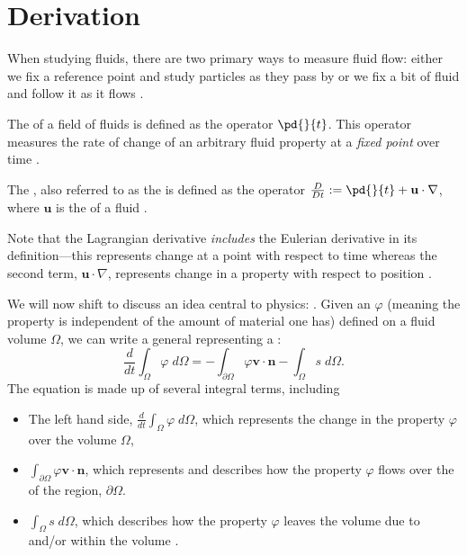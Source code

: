 \documentclass[12pt]{article}
\renewcommand{\vec}[1]{\mathbf{#1}}
\begin{document}
    \section{Derivation}
    When studying fluids, there are two primary ways to measure fluid flow: either we fix a reference point and study particles as they pass by or we fix a bit of fluid and follow it as it flows \cite{wikiderivation}.
    \begin{definition}
        The  of a field of fluids is defined as the operator $\pd{}{t}$. This operator measures the rate of change of an arbitrary fluid property at a \emph{fixed point} over time \cite{caltech}.
    \end{definition}
    \begin{definition}
        The , also referred to as the  is defined as the operator $\frac{D}{Dt} := \pd{}{t}+\vec{u}\cdot\nabla$, where $\vec{u}$ is the  of a fluid \cite{wikiderivation}.
    \end{definition}
    \begin{remark}
        Note that the Lagrangian derivative \emph{includes} the Eulerian derivative in its definition---this represents change at a point with respect to time whereas the second term, $\vec{u}\cdot\nabla$, represents change in a property with respect to position \cite{wikiderivation}.
    \end{remark}
    We will now shift to discuss an idea central to physics: . Given an  $\varphi$ (meaning the property is independent of the amount of material one has) defined on a fluid volume $\Omega$, we can write a general  representing a  \cite{derivation}:
    \[ \frac{d}{dt} \int_\Omega \varphi\;d\Omega=-\int_{\partial\Omega}\varphi\vec{v}\cdot\vec{n}-\int_\Omega s\;d\Omega. \]
    The equation is made up of several integral terms, including
    \begin{itemize}
        \item The left hand side, $\frac{d}{dt}\int_\Omega \varphi\;d\Omega$, which represents the change in the property $\varphi$ over the volume $\Omega$,
        \item  $\int_{\partial\Omega} \varphi\vec{v}\cdot\vec{n}$, which represents  and describes how the property $\varphi$ flows over the  of the region, $\partial\Omega$.
        \item  $\int_\Omega s\;d\Omega$, which describes how the property $\varphi$ leaves the volume due to  and/or  within the volume \cite{derivation}.
    \end{itemize}
\end{document}
